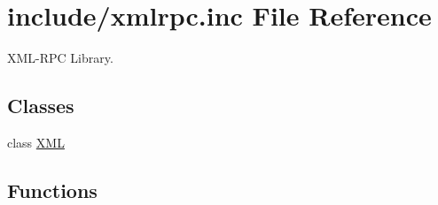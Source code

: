 \hypertarget{xmlrpc_8inc}{
\section{include/xmlrpc.inc File Reference}
\label{xmlrpc_8inc}
}
XML-RPC Library. 

\subsection*{Classes}
\begin{CompactItemize}
\item 
class \hyperlink{classXML}{XML}
\end{CompactItemize}
\subsection*{Functions}
